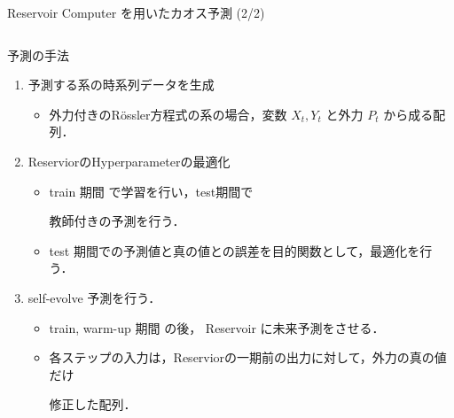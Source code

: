 \begin{frame}{Reservoir Computer を用いたカオス予測 (2/2)}
\begin{columns}[T] %

    \begin{column}{.5\textwidth}
    \vspace{-.35cm}
    \begin{block}{予測の手法}
      \begin{enumerate}
        \item 予測する系の時系列データを生成\begin{itemize}
          \item 外力付きのRössler方程式の系の場合，変数 $X_t, Y_t$ と外力 $P_t$ から成る配列．
        \end{itemize}
        \item ReserviorのHyperparameterの最適化\begin{itemize}
          \item train 期間 で学習を行い，test期間で
          
          教師付きの予測を行う．
          \item test 期間での予測値と真の値との誤差を目的関数として，最適化を行う．
        \end{itemize}
        \item self-evolve 予測を行う．\begin{itemize}
          \item train, warm-up 期間 の後，
          Reservoir に未来予測をさせる．
          \item 各ステップの入力は，Reserviorの一期前の出力に対して，外力の真の値だけ
          
          修正した配列．
        \end{itemize}
    \end{enumerate}
    \end{block}
    \end{column}


\end{columns}
\end{frame}
